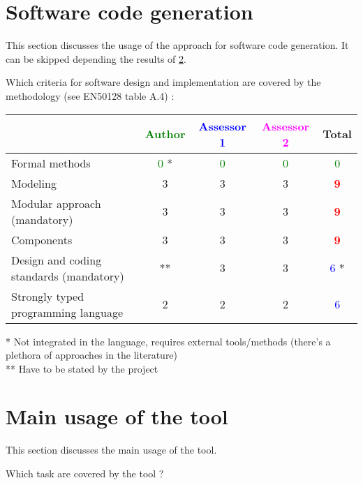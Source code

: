 \section{Software code generation}
This section discusses the usage of the approach for software code generation.
It can be skipped depending the results of \ref{main_usage}.

Which criteria for software design and implementation are covered by the methodology
(see EN50128 table A.4) :

\begin{tabular}{|l | c | c | c | c|}
\hline
& \textcolor{green}{Author} & \textcolor{blue}{Assessor 1} & \textcolor{magenta}{Assessor 2} & Total \\
\hline
Formal methods & \textcolor{green}{0}  * & \textcolor{green}{0}   & \textcolor{green}{0}   & \textcolor{green}{0} \\
\hline
Modeling &3 &3 &3 & \textcolor{red}{\textbf{9}} \\
\hline
Modular approach (mandatory) &3 &3 &3 & \textcolor{red}{\textbf{9}} \\
\hline
Components &3 &3 &3 & \textcolor{red}{\textbf{9}} \\
\hline
Design and coding standards (mandatory) &** &3 &3 & \textcolor{blue}{6} * \\
\hline
Strongly typed programming language &2 &2 &2 & \textcolor{blue}{6} \\
\hline

\end{tabular}

\begin{author_comment}
 * Not integrated in the language, requires external tools/methods (there's a plethora of approaches in the literature)\\
 ** Have to be stated by the project
\end{author_comment}

\section{Main usage of the tool}
\label{main_usage}

This section discusses the main usage of the tool.

Which task are covered by the tool ?


